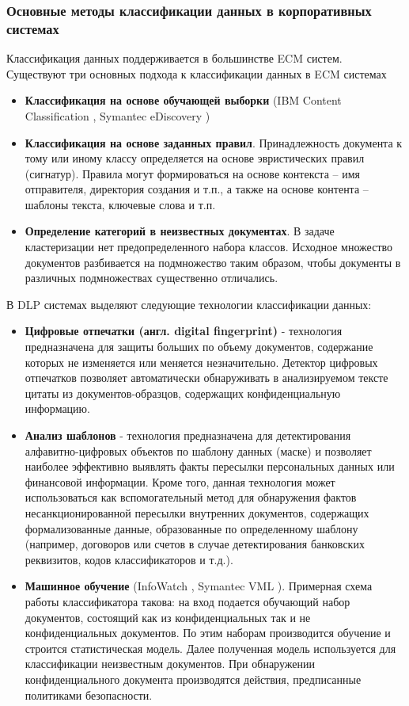 \documentclass[russian, utf8, emptystyle]{eskdtext}
\begin{document}
\subsubsection{Основные методы классификации данных в корпоративных системах}
Классификация данных поддерживается в большинстве ECM систем. Существуют три основных подхода к классификации данных в ECM системах
\begin{itemize}
	\item {\bf Классификация на основе обучающей выборки} (IBM Content Classification \cite{ContentClassification}, Symantec eDiscovery \cite{Symantec})
	\item {\bf Классификация на основе заданных правил}. Принадлежность документа к тому или иному классу определяется на основе эвристических правил (сигнатур). Правила могут формироваться на основе контекста – имя отправителя, директория создания и т.п., а также на основе контента – шаблоны текста, ключевые слова и т.п. 
	\item {\bf Определение категорий в неизвестных документах}.
	В задаче кластеризации нет предопределенного набора классов. Исходное множество документов разбивается на подмножество таким образом, чтобы документы в различных подмножествах существенно отличались.
\end{itemize}
В DLP системах выделяют следующие технологии классификации данных:
\begin{itemize}
	\item {\bf Цифровые отпечатки (англ. digital fingerprint)} - технология предназначена для защиты больших по объему документов, содержание которых не изменяется или меняется незначительно. Детектор цифровых отпечатков позволяет автоматически обнаруживать в анализируемом тексте цитаты из документов-образцов, содержащих конфиденциальную информацию.
	\item {\bf Анализ шаблонов} - технология предназначена для детектирования алфавитно-цифровых объектов по шаблону данных (маске) и позволяет наиболее эффективно выявлять факты пересылки персональных данных или финансовой информации. Кроме того, данная технология может использоваться как вспомогательный метод для обнаружения фактов несанкционированной пересылки внутренних документов, содержащих формализованные данные, образованные по определенному шаблону (например, договоров или счетов в случае детектирования банковских реквизитов, кодов классификаторов и т.д.).
	\item {\bf Машинное обучение} (InfoWatch \cite{bkf}, Symantec VML \cite{MachLearn}). Примерная схема работы классификатора такова: на вход подается обучающий набор документов, состоящий как из конфиденциальных так и не конфиденциальных документов. По этим наборам производится обучение и строится статистическая модель. Далее полученная модель используется для классификации неизвестным документов. При обнаружении конфиденциального документа производятся действия, предписанные политиками безопасности.
\end{itemize}
\end{document}
